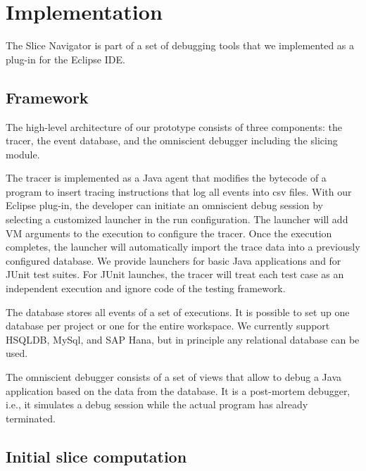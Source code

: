 ﻿\documentclass[
      english,
			conference,
      ]{IEEEtran}
\newcommand{\todo}[2][]{\pdfmargincomment[color=orange,icon=Note,subject={TODO},author={#1}]{#2}}
\begin{document}
\todo{move this to evaluation}

\section{Implementation}
\label{sec:impl}

The Slice Navigator is part of a set of debugging tools that we implemented as a plug-in for the Eclipse IDE.

\subsection{Framework}

The high-level architecture of our prototype consists of three components: the tracer, the event database, and the omniscient debugger including the slicing module.

The tracer is implemented as a Java agent that modifies the bytecode of a program to insert tracing instructions that log all events into csv files.
With our Eclipse plug-in, the developer can initiate an omniscient debug session by selecting a customized launcher in the run configuration.
The launcher will add VM arguments to the execution to configure the tracer.
Once the execution completes, the launcher will automatically import the trace data into a previously configured database.
We provide launchers for basic Java applications and for JUnit test suites.
For JUnit launches, the tracer will treat each test case as an independent execution and ignore code of the testing framework.

The database stores all events of a set of executions.
It is possible to set up one database per project or one for the entire workspace.
We currently support HSQLDB, MySql, and SAP Hana, but in principle any relational database can be used.

The omniscient debugger consists of a set of views that allow to debug a Java application based on the data from the database.
It is a post-mortem debugger, i.e., it simulates a debug session while the actual program has already terminated.

\subsection{Initial slice computation}
\end{document}
